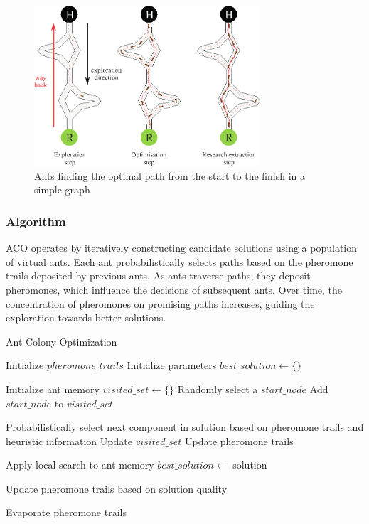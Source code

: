 \documentclass{article}
\begin{document}
\begin{figure}[h]
    \centering
    \includegraphics[width=0.75\textwidth,keepaspectratio]{aco.jpg}
    \caption{Ants finding the optimal path from the start to the finish in a simple graph}
    \label{fig:ant}
\end{figure}

\subsubsection{Algorithm}
ACO operates by iteratively constructing candidate solutions using a population of virtual ants. Each ant probabilistically selects paths based on the pheromone trails deposited by previous ants. As ants traverse paths, they deposit pheromones, which influence the decisions of subsequent ants. Over time, the concentration of pheromones on promising paths increases, guiding the exploration towards better solutions.
\begin{algorithm}[!h]
    \DontPrintSemicolon
    \caption{Ant Colony Optimization}
    \label{alg:aco}
    \KwResult{}

    Initialize $pheromone\_trails$\;
    Initialize parameters\;
    $best\_solution\gets\{\}$\;
    {
        {
            Initialize ant memory\;
            $visited\_set\gets\{\}$\;
            Randomly select a $start\_node$\;
            Add $start\_node$ to $visited\_set$\;

            {
                Probabilistically select next component in solution based on pheromone trails and heuristic information\;
                Update $visited\_set$\;
                Update pheromone trails\;
            }
        
            Apply local search to ant memory\;
            {
                $best\_solution\gets$ solution\;
            }
        
            Update pheromone trails based on solution quality\;
        }
        Evaporate pheromone trails\;
    }
    
\end{algorithm}
\end{document}
